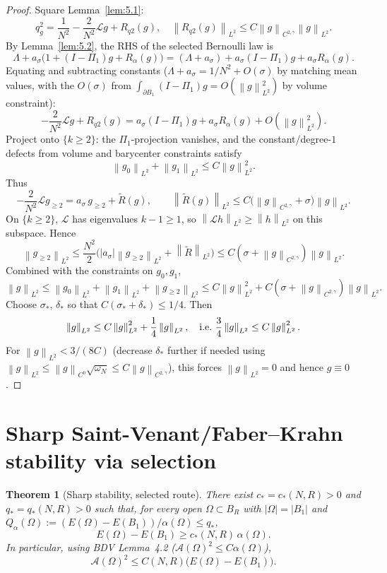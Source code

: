 \documentclass[11pt]{article}
\newtheorem{theorem}{Theorem}
\theoremstyle{definition}
\newcommand{\norm}[1]{\left\|#1\right\|}
\newcommand{\abs}[1]{\left|#1\right|}
\begin{document}
\begin{proof}
Square Lemma~\ref{lem:5.1}:
\[
q_g^2=\frac{1}{N^2}-\frac{2}{N^2}\mathcal L g+R_{q2}(g),
\quad\norm{R_{q2}(g)}_{L^2}\le C\norm{g}_{C^{2,\gamma}}\norm{g}_{L^2}.
\]
By Lemma~\ref{lem:5.2}, the RHS of the selected Bernoulli law is
\[
\Lambda+a_\sigma\bigl(1+(I-\Pi_1)g+R_\alpha(g)\bigr)
=(\Lambda+a_\sigma)+a_\sigma(I-\Pi_1)g+a_\sigma R_\alpha(g).
\]
Equating and subtracting constants ($\Lambda+a_\sigma=1/N^2+O(\sigma)$ by
matching mean values, with the $O(\sigma)$ from
$\int_{\partial B_1}(I-\Pi_1)g=O(\norm{g}_{L^2}^2)$ by volume constraint):
\[
-\frac{2}{N^2}\mathcal L g+R_{q2}(g)
=a_\sigma(I-\Pi_1)g+a_\sigma R_\alpha(g)+O(\norm{g}_{L^2}^2).
\]
Project onto $\{k\ge2\}$: the $\Pi_1$-projection vanishes, and the
constant/degree-$1$ defects from volume and barycenter constraints satisfy
\[
\norm{g_0}_{L^2}+\norm{g_1}_{L^2}\le C\norm{g}_{L^2}^2.
\]
Thus
\[
-\frac{2}{N^2}\mathcal L g_{\ge2}
=a_\sigma\,g_{\ge2}+\widetilde R(g),
\qquad
\norm{\widetilde R(g)}_{L^2}\le C\bigl(\norm{g}_{C^{2,\gamma}}+\sigma\bigr)\norm{g}_{L^2}.
\]
On $\{k\ge2\}$, $\mathcal L$ has eigenvalues $k-1\ge1$, so
$\norm{\mathcal Lh}_{L^2}\ge\norm{h}_{L^2}$ on this subspace. Hence
\[
\norm{g_{\ge2}}_{L^2}
\le\frac{N^2}{2}\bigl(\abs{a_\sigma}\norm{g_{\ge2}}_{L^2}+\norm{\widetilde R}_{L^2}\bigr)
\le C(\sigma+\norm{g}_{C^{2,\gamma}})\norm{g}_{L^2}.
\]
Combined with the constraints on $g_0,g_1$,
\[
\norm{g}_{L^2}
\le\norm{g_0}_{L^2}+\norm{g_1}_{L^2}+\norm{g_{\ge2}}_{L^2}
\le C\norm{g}_{L^2}^2+C(\sigma+\norm{g}_{C^{2,\gamma}})\norm{g}_{L^2}.
\]
Choose $\sigma_*$, $\delta_*$ so that $C(\sigma_*+\delta_*)\le1/4$. Then
\[
\norm{g}_{L^2}\le C\norm{g}_{L^2}^2+\frac{1}{4}\norm{g}_{L^2},
\quad\hbox{i.e.\ }
\frac{3}{4}\norm{g}_{L^2}\le C\norm{g}_{L^2}^2.
\]
For $\norm{g}_{L^2}<3/(8C)$ (decrease $\delta_*$ further if needed using
$\norm{g}_{L^2}\le\norm{g}_{C^0}\sqrt{\omega_N}\le C\norm{g}_{C^{2,\gamma}}$),
this forces $\norm{g}_{L^2}=0$ and hence $g\equiv0$.
\end{proof}

\section{Sharp Saint-Venant/Faber--Krahn stability via selection}\label{sec:sharp}

\begin{theorem}[Sharp stability, selected route]\label{thm:sharp}
There exist $c_*=c_*(N,R)>0$ and $q_*=q_*(N,R)>0$ such that, for every
open $\Omega\subset B_R$ with $\abs{\Omega}=\abs{B_1}$ and
$Q_\alpha(\Omega):=(E(\Omega)-E(B_1))/\alpha(\Omega)\le q_*$,
\[
E(\Omega)-E(B_1)\ge c_*(N,R)\,\alpha(\Omega).
\]
In particular, using BDV Lemma~4.2 ($\mathcal A(\Omega)^2\le C\alpha(\Omega)$),
\[
\mathcal A(\Omega)^2\le C(N,R)\bigl(E(\Omega)-E(B_1)\bigr).
\]
\end{theorem}
\end{document}
